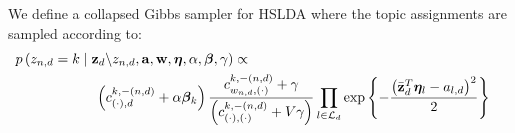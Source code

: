 \documentclass[portrait]{sciposter}
\begin{document}
\begin{multicols}{3}
We define a collapsed Gibbs sampler for HSLDA where the topic assignments are sampled according to:  
\begin{eqnarray*}
\lefteqn{p\left(z_{n,d}=k\mid\mathbf{z}_d\backslash z_{n,d},\mathbf{a},\mathbf{w},\mathbf{\boldsymbol\eta},\alpha,\boldsymbol\beta,\gamma\right)\propto}\nonumber \\
 & \hspace{2cm}\left(c_{\left(\cdot\right),d}^{k,-\left(n,d\right)}+\alpha\boldsymbol\beta_{k}\right)\frac{c_{w_{n,d},\left(\cdot\right)}^{k,-\left(n,d\right)}+\gamma}{\left(c_{\left(\cdot\right),\left(\cdot\right)}^{k,-\left(n,d\right)}+V\gamma\right)}\prod_{l\in\mathcal{L}_{d}}\exp\left\{ -\frac{\left(\bar{\mathbf{z}}_{d}^{T}\boldsymbol\eta_{l}-a_{l,d}\right)^{2}}{2}\right\} \label{eq:z-likelihood}\end{eqnarray*}




\end{multicols}
\end{document}
